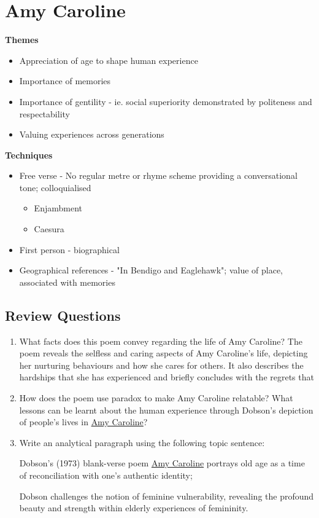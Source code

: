 \section{Amy Caroline} \label{27/11/2024}
	\textbf{Themes}
	\begin{itemize}
		\item Appreciation of age to shape human experience
		\item Importance of memories
		\item Importance of gentility - ie. social superiority demonstrated by politeness and respectability
		\item Valuing experiences across generations
	\end{itemize}

	\textbf{Techniques}
	\begin{itemize}
		\item Free verse - No regular metre or rhyme scheme providing a conversational tone; colloquialised
		\begin{itemize}
			\item Enjambment
			\item Caesura
		\end{itemize}
		\item First person - biographical
		\item Geographical references - "In Bendigo and Eaglehawk"; value of place, associated with memories
	\end{itemize}

	\subsection{Review Questions}
	\begin{enumerate}
		\item What facts does this poem convey regarding the life of Amy Caroline?
		\subitem The poem reveals the selfless and caring aspects of Amy Caroline's life, depicting her nurturing behaviours and how she cares for others. It also describes the hardships that she has experienced and briefly concludes with the regrets that 

		\item How does the poem use paradox to make Amy Caroline relatable? What lessons can be learnt about the human experience through Dobson's depiction of people's lives in \underline{Amy Caroline}?
		\item Write an analytical paragraph using the following topic sentence:
		
		Dobson's (1973) blank-verse poem \underline{Amy Caroline} portrays old age as a time of reconciliation with one's authentic identity;
		
		Dobson challenges the notion of feminine vulnerability, revealing the profound beauty and strength within elderly experiences of femininity.
	\end{enumerate}


